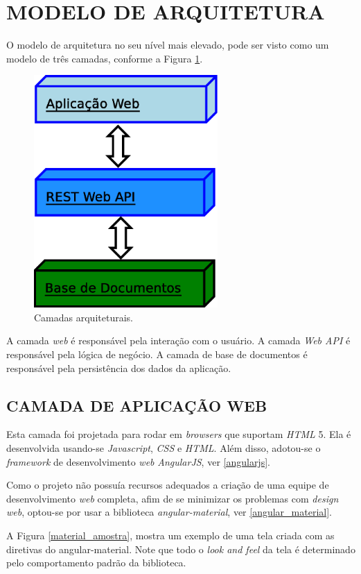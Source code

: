 \section[MODELO DE ARQUITETURA]{MODELO DE ARQUITETURA}

O modelo de arquitetura no seu nível mais elevado, pode ser visto como um modelo de três camadas, conforme a Figura \ref{camadas_arquitetura}.
\begin{figure}[ht]
	\centering
	\includegraphics[width=7cm]{figuras/camadas.eps}
	\caption{Camadas arquiteturais.}
	\label{camadas_arquitetura}
\end{figure}

A camada \emph{web} é responsável pela interação com o usuário. 
A camada \emph{Web API} é responsável pela lógica de negócio. 
A camada de base de documentos é responsável pela persistência dos dados da aplicação.


\subsection[CAMADA DE APLICAÇÃO WEB] {CAMADA DE APLICAÇÃO WEB}
Esta camada foi projetada para rodar em \emph{browsers} que suportam \emph{HTML} 5. 
Ela é desenvolvida usando-se \emph{Javascript}, \emph{CSS} e \emph{HTML}. 
Além disso, adotou-se o \emph{framework} de desenvolvimento \emph{web} \emph{AngularJS}, ver \ref{angularjs}. 

Como o projeto não possuía recursos adequados a criação de uma equipe de desenvolvimento \emph{web} completa, afim de se minimizar os problemas com \emph{design web}, optou-se por usar a biblioteca \emph{angular-material}, ver \ref{angular_material}. 

A Figura \ref{material_amostra}, mostra um exemplo de uma tela criada com as diretivas do angular-material. Note que todo o \emph{look and feel} da tela é determinado pelo comportamento padrão da biblioteca.

